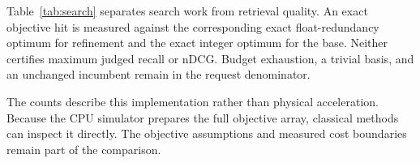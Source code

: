 Table~\ref{tab:search} separates search work from retrieval quality. An exact objective hit is measured against the corresponding exact float-redundancy optimum for refinement and the exact integer optimum for the base. Neither certifies maximum judged recall or nDCG. Budget exhaustion, a trivial basis, and an unchanged incumbent remain in the request denominator.

\begin{table}[t]
\centering\small
\caption{Recorded search work and combined selector latency in milliseconds. The first phase column counts inherited base work for refined policies; it is zero for base-only FiQA. The next column counts the current stage. Optimum-hit definitions follow the text.}
\label{tab:search}
\end{table}

The counts describe this implementation rather than physical acceleration. Because the CPU simulator prepares the full objective array, classical methods can inspect it directly. The objective assumptions and measured cost boundaries remain part of the comparison.
